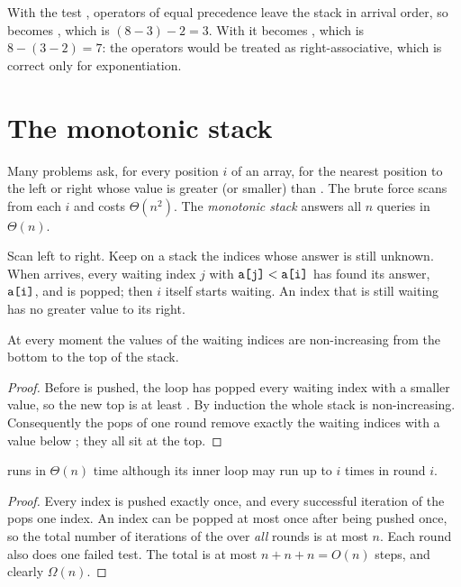 \begin{proposition}[Why \cc{>=}]
With the test , operators of equal precedence leave the stack
in arrival order, so  becomes , which is $(8-3)-2=3$. With
 it becomes , which is $8-(3-2)=7$: the operators
would be treated as right-associative, which is correct only for exponentiation.
\end{proposition}

\section{The monotonic stack}\label{sec:monostack}

Many problems ask, for every position $i$ of an array, for the nearest position to the
left or right whose value is greater (or smaller) than . The brute force scans
from each $i$ and costs $\Theta(n^2)$. The \emph{monotonic stack} answers all $n$ queries
in $\Theta(n)$.

 Scan left to right. Keep on a stack the indices whose
answer is still unknown. When  arrives, every waiting index $j$ with
$\texttt{a[j]}<\texttt{a[i]}$ has found its answer, $\texttt{a[i]}$, and is popped; then $i$ itself
starts waiting. An index that is still waiting has no greater value to its right.


\begin{proposition}
At every moment the values  of the waiting indices are non-increasing from the
bottom to the top of the stack.
\end{proposition}
\begin{proof}
Before  is pushed, the loop has popped every waiting index with a smaller value,
so the new top is at least . By induction the whole stack is non-increasing.
Consequently the pops of one round remove exactly the waiting indices with a value
below ; they all sit at the top.
\end{proof}

\begin{theorem}\label{thm:monostack}
 runs in $\Theta(n)$ time although its inner  loop may run up
to $i$ times in round $i$.
\end{theorem}
\begin{proof}
Every index is pushed exactly once, and every successful iteration of the 
pops one index. An index can be popped at most once after being pushed once, so the
total number of iterations of the  over \emph{all} rounds is at most $n$. Each
round also does one failed test. The total is at most $n+n+n=O(n)$ steps, and clearly
$\Omega(n)$.
\end{proof}


